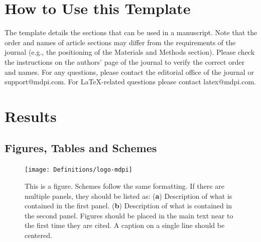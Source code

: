 \documentclass[mathematics,article,submit,pdftex,moreauthors]{Definitions/mdpi}
\begin{document}
\setcounter{section}{-1} %
\section{How to Use this Template}

The template details the sections that can be used in a manuscript. Note that the order and names of article sections may differ from the requirements of the journal (e.g., the positioning of the Materials and Methods section). Please check the instructions on the authors' page of the journal to verify the correct order and names. For any questions, please contact the editorial office of the journal or support@mdpi.com. For LaTeX-related questions please contact latex@mdpi.com.%




\section{Results}
\subsection{Figures, Tables and Schemes}

\begin{figure}[H]
\texttt{[image: Definitions/logo-mdpi]}
\caption{This is a figure. Schemes follow the same formatting. If there are multiple panels, they should be listed as: (\textbf{a}) Description of what is contained in the first panel. (\textbf{b}) Description of what is contained in the second panel. Figures should be placed in the main text near to the first time they are cited. A caption on a single line should be centered.\label{fig1}}
\end{figure}
\unskip
\end{document}
